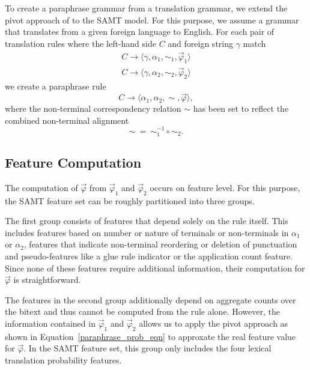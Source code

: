 \documentclass[11pt]{article}
\begin{document}
To create a paraphrase grammar from a translation grammar, we extend
the pivot approach of  to the SAMT
model. For this purpose, we assume a grammar that translates from a
given foreign language to English. For each pair of translation rules where
the left-hand side $C$ and foreign string $\gamma$ match
\begin{eqnarray*}
C \rightarrow \langle \gamma, \alpha_1, \sim_1, \vec{\varphi}_1 \rangle \\
C \rightarrow \langle \gamma, \alpha_2, \sim_2, \vec{\varphi}_2 \rangle
\end{eqnarray*}
we create a paraphrase rule
\begin{equation*}
C \rightarrow \langle \alpha_1, \alpha_2, \sim, \vec{\varphi} \rangle ,
\end{equation*}
where the non-terminal correspondency relation $\sim$ has been set to
reflect the combined non-terminal alignment
\begin{equation*}
\sim ~ = ~ \sim_1^{-1} \circ \sim_2 .
\end{equation*}

\subsection{Feature Computation}

The computation of $\vec{\varphi}$ from $\vec{\varphi}_1$ and
$\vec{\varphi}_2$ occurs on feature level. For this purpose, the SAMT
feature set can be roughly partitioned into three groups.

The first group consists of features that depend solely on the rule
itself. This includes features based on number or nature of terminals
or non-terminals in $\alpha_1$ or $\alpha_2$, features that indicate
non-terminal reordering or deletion of punctuation and pseudo-features
like a glue rule indicator or the application count feature. Since
none of these features require additional information, their
computation for $\vec{\varphi}$ is straightforward.

The features in the second group additionally depend on aggregate
counts over the bitext and thus cannot be computed from the rule
alone. However, the information contained in $\vec{\varphi}_1$ and
$\vec{\varphi}_2$ allows us to apply the pivot approach as shown in
Equation~\ref{paraphrase_prob_eqn} to approxate the real feature value
for $\vec{\varphi}$. In the SAMT feature set, this group only includes
the four lexical translation probability features.
\end{document}

